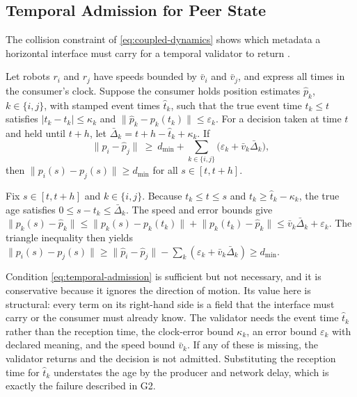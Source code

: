 

\subsection{Temporal Admission for Peer State}
\label{sec:temporal-admission}

The collision constraint of \eqref{eq:coupled-dynamics} shows which metadata a
horizontal interface must carry for a temporal validator to return \true.

\begin{proposition}
\label{prop:temporal-admission}
Let robots $r_i$ and $r_j$ have speeds bounded by $\bar v_i$ and $\bar v_j$, and
express all times in the consumer's clock.  Suppose the consumer holds position
estimates $\hat p_k$, $k\in\{i,j\}$, with stamped event times $\hat t_k$, such
that the true event time $t_k\le t$ satisfies $\lvert\hat t_k-t_k\rvert\le
\kappa_k$ and $\lVert\hat p_k-p_k(t_k)\rVert\le\varepsilon_k$.  For a decision
taken at time $t$ and held until $t+h$, let
$\bar\Delta_k=t+h-\hat t_k+\kappa_k$.  If
\begin{equation}
  \lVert\hat p_i-\hat p_j\rVert\ \ge\ d_{\min}
  +\sum_{k\in\{i,j\}}\bigl(\varepsilon_k+\bar v_k\bar\Delta_k\bigr),
  \label{eq:temporal-admission}
\end{equation}
then $\lVert p_i(s)-p_j(s)\rVert\ge d_{\min}$ for all $s\in[t,t+h]$.
\end{proposition}

\begin{IEEEproof}
Fix $s\in[t,t+h]$ and $k\in\{i,j\}$.  Because $t_k\le t\le s$ and
$t_k\ge\hat t_k-\kappa_k$, the true age satisfies
$0\le s-t_k\le\bar\Delta_k$.  The speed and error bounds give
$\lVert p_k(s)-\hat p_k\rVert\le\lVert p_k(s)-p_k(t_k)\rVert
+\lVert p_k(t_k)-\hat p_k\rVert\le\bar v_k\bar\Delta_k+\varepsilon_k$.  The
triangle inequality then yields $\lVert p_i(s)-p_j(s)\rVert\ge\lVert\hat
p_i-\hat p_j\rVert-\sum_k(\varepsilon_k+\bar v_k\bar\Delta_k)\ge d_{\min}$.
\end{IEEEproof}

Condition \eqref{eq:temporal-admission} is sufficient but not necessary, and it
is conservative because it ignores the direction of motion.  Its value here is
structural: every term on its right-hand side is a field that the interface must
carry or the consumer must already know.  The validator needs the event time
$\hat t_k$ rather than the reception time, the clock-error bound $\kappa_k$, an
error bound $\varepsilon_k$ with declared meaning, and the speed bound $\bar v_k$.
If any of these is missing, the validator returns \unknown{} and the decision is
not admitted.  Substituting the reception time for $\hat t_k$ understates the
age by the producer and network delay, which is exactly the failure described
in G2.

